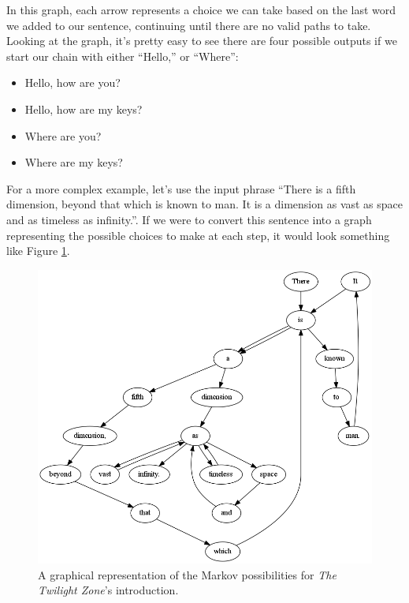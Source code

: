 \documentclass[11pt]{cselabheader}
\begin{document}
In this graph, each arrow represents a choice we can take based on the last word we added to our sentence, continuing until there are no valid paths to take. Looking at the graph, it's pretty easy to see there are four possible outputs if we start our chain with either ``Hello,'' or ``Where'':

\begin{itemize}
\item Hello, how are you?
\item Hello, how are my keys?
\item Where are you?
\item Where are my keys?
\end{itemize}

For a more complex example, let's use the input phrase ``There is a fifth dimension, beyond that which is known to man. It is a dimension as vast as space and as timeless as infinity.''. If we were to convert this sentence into a graph representing the possible choices to make at each step, it would look something like Figure \ref{twilight}.

\begin{figure}[h]
  \centering
  \includegraphics[width=\linewidth]{lab10/twilight_zone}
  \caption{A graphical representation of the Markov possibilities for \emph{The Twilight Zone}'s introduction.}
  \label{twilight}
\end{figure}
\end{document}
